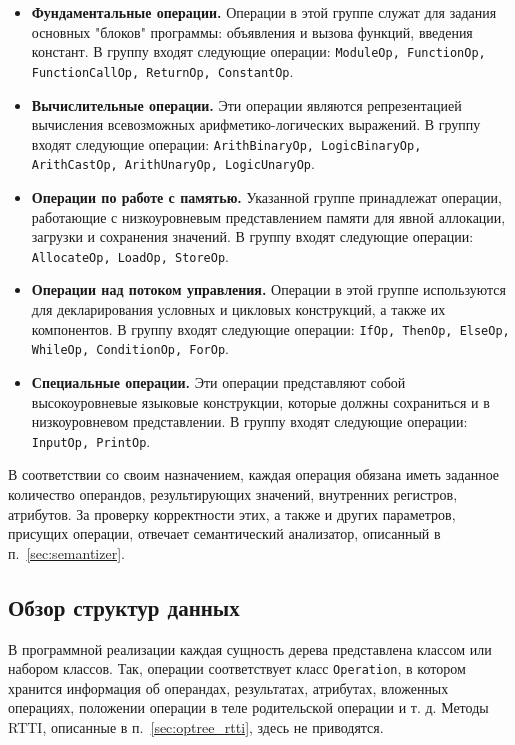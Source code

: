 \begin{itemize}
    \item \textbf{Фундаментальные операции.}
          Операции в этой группе служат для задания основных "блоков" программы: объявления и вызова функций, введения констант.
          В группу входят следующие операции:
          \verb|ModuleOp, FunctionOp, FunctionCallOp, ReturnOp, ConstantOp|.
    \item \textbf{Вычислительные операции.}
          Эти операции являются репрезентацией вычисления всевозможных арифметико-логических выражений.
          В группу входят следующие операции:
          \verb|ArithBinaryOp, LogicBinaryOp, ArithCastOp, ArithUnaryOp, LogicUnaryOp|.
    \item \textbf{Операции по работе с памятью.}
          Указанной группе принадлежат операции, работающие с низкоуровневым представлением памяти для явной аллокации, загрузки и сохранения значений.
          В группу входят следующие операции:
          \verb|AllocateOp, LoadOp, StoreOp|.
    \item \textbf{Операции над потоком управления.}
          Операции в этой группе используются для декларирования условных и цикловых конструкций, а также их компонентов.
          В группу входят следующие операции:
          \verb|IfOp, ThenOp, ElseOp, WhileOp, ConditionOp, ForOp|.
    \item \textbf{Специальные операции.}
          Эти операции представляют собой высокоуровневые языковые конструкции, которые должны сохраниться и в низкоуровневом представлении.
          В группу входят следующие операции:
          \verb|InputOp, PrintOp|.
\end{itemize}

В соответствии со своим назначением, каждая операция обязана иметь заданное количество операндов, результирующих значений, внутренних регистров, атрибутов.
За проверку корректности этих, а также и других параметров, присущих операции, отвечает семантический анализатор, описанный в п.~\ref{sec:semantizer}.

\subsection{Обзор структур данных}

В программной реализации каждая сущность дерева представлена классом или набором классов.
Так, операции соответствует класс \verb|Operation|, в котором хранится информация об операндах, результатах, атрибутах, вложенных операциях, положении операции в теле родительской операции и т. д. Методы RTTI, описанные в п.~\ref{sec:optree_rtti}, здесь не приводятся.

